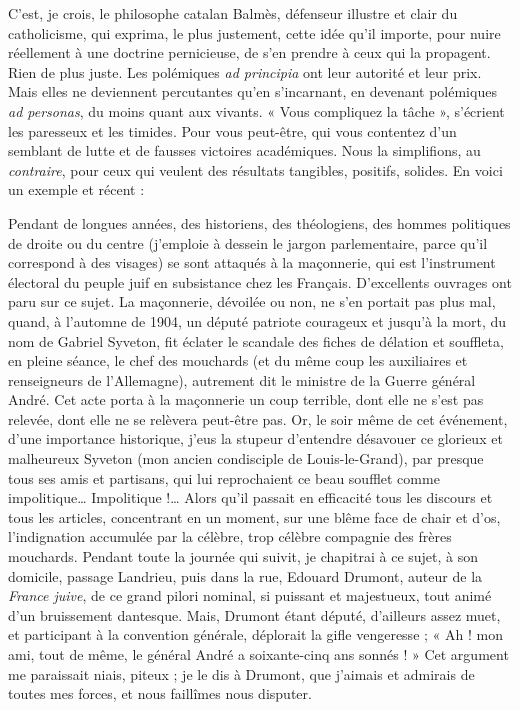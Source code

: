 \documentclass[french,twoside]{book} %
\begin{document}
C’est, je crois, le philosophe catalan Balmès, défenseur illustre et clair du catholicisme, qui exprima, le plus justement, cette idée qu’il importe, pour nuire réellement à une doctrine pernicieuse, de s’en prendre à ceux qui la propagent. Rien de plus juste. Les polémiques {\itshape ad principia} ont leur autorité et leur prix. Mais elles ne deviennent percutantes qu’en s’incarnant, en devenant polémiques {\itshape ad personas}, du moins quant aux vivants. « Vous compliquez la tâche », s’écrient les paresseux et les timides. Pour vous peut-être, qui vous contentez d’un semblant de lutte et de fausses victoires académiques. Nous la simplifions, au {\itshape contraire}, pour ceux qui veulent des résultats tangibles, positifs, solides. En voici un exemple et récent :\par
Pendant de longues années, des historiens, des théologiens, des hommes politiques de droite ou du centre (j’emploie à dessein le jargon parlementaire, parce qu’il correspond à des visages) se sont attaqués à la maçonnerie, qui est l’instrument électoral du peuple juif en subsistance chez les Français. D’excellents ouvrages ont paru sur ce sujet. La maçonnerie, dévoilée ou non, ne s’en portait pas plus mal, quand, à l’automne de 1904, un député patriote courageux et jusqu’à la mort, du nom de Gabriel Syveton, fit éclater le scandale des fiches de délation et souffleta, en pleine séance, le chef des mouchards (et du même coup les auxiliaires et renseigneurs de l’Allemagne), autrement dit le ministre de la Guerre général André. Cet acte porta à la maçonnerie un coup terrible, dont elle ne s’est pas relevée, dont elle ne se relèvera peut-être pas. Or, le soir même de cet événement, d’une importance historique, j’eus la stupeur d’entendre désavouer ce glorieux et malheureux Syveton (mon ancien condisciple de Louis-le-Grand), par presque tous ses amis et partisans, qui lui reprochaient ce beau soufflet comme impolitique… Impolitique !… Alors qu’il passait en efficacité tous les discours et tous les articles, concentrant en un moment, sur une blême face de chair et d’os, l’indignation accumulée par la célèbre, trop célèbre compagnie des frères mouchards. Pendant toute la journée qui suivit, je chapitrai à ce sujet, à son domicile, passage Landrieu, puis dans la rue, Edouard Drumont, auteur de la {\itshape France juive}, de ce grand pilori nominal, si puissant et majestueux, tout animé d’un bruissement dantesque. Mais, Drumont étant député, d’ailleurs assez muet, et participant à la convention générale, déplorait la gifle vengeresse ; « Ah ! mon ami, tout de même, le général André a soixante-cinq ans sonnés ! » Cet argument me paraissait niais, piteux ; je le dis à Drumont, que j’aimais et admirais de toutes mes forces, et nous faillîmes nous disputer.\par
\end{document}
